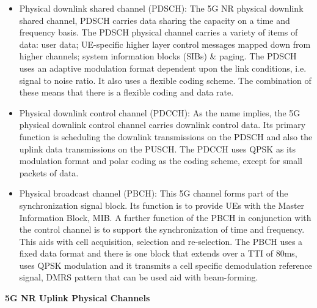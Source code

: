 \begin{itemize}
    \item Physical downlink shared channel (PDSCH): The 5G NR physical downlink shared channel, PDSCH carries data sharing the capacity on a time and frequency basis. The PDSCH physical channel carries a variety of items of data: user data; UE-specific higher layer control messages mapped down from higher channels; system information blocks (SIBs) \& paging.
    \newline
    The PDSCH uses an adaptive modulation format dependent upon the link conditions, i.e. signal to noise ratio. It also uses a flexible coding scheme. The combination of these means that there is a flexible coding and data rate.
    \item Physical downlink control channel (PDCCH): As the name implies, the 5G physical downlink control channel carries downlink control data. Its primary function is scheduling the downlink transmissions on the PDSCH and also the uplink data transmissions on the PUSCH.
    \newline
    The PDCCH uses QPSK as its modulation format and polar coding as the coding scheme, except for small packets of data.
    \item Physical broadcast channel (PBCH): This 5G channel forms part of the synchronization signal block. Its function is to provide UEs with the Master Information Block, MIB. A further function of the PBCH in conjunction with the control channel is to support the synchronization of time and frequency. This aids with cell acquisition, selection and re-selection.
    \newline
    The PBCH uses a fixed data format and there is one block that extends over a TTI of 80ms, uses QPSK modulation and it transmits a cell specific demodulation reference signal, DMRS pattern that can be used aid with beam-forming.
\end{itemize}


\textbf{5G NR Uplink Physical Channels}

